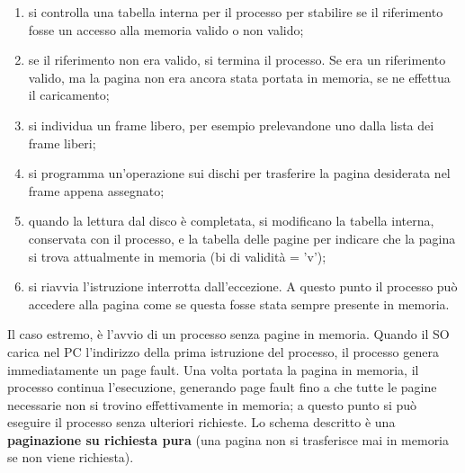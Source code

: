 \documentclass{article}
\begin{document}
				\begin{figure}[ht!]
				\end{figure}
				\begin{enumerate}
					\item si controlla una tabella interna per il processo per stabilire se il riferimento fosse un accesso alla memoria valido o non valido;
					\item se il riferimento non era valido, si termina il processo. Se era un riferimento valido, ma la pagina non era ancora stata portata in memoria, se ne effettua il caricamento;
					\item si individua un frame libero, per esempio prelevandone uno dalla lista dei frame liberi;
					\item si programma un’operazione sui dischi per trasferire la pagina desiderata nel frame appena assegnato;
					\item quando la lettura dal disco è completata, si modificano la tabella interna, conservata con il processo, e la tabella delle pagine per indicare che la pagina si trova attualmente in memoria (bi di validità = 'v');
					\item si riavvia l’istruzione interrotta dall’eccezione. A questo punto il processo può
					accedere alla pagina come se questa fosse stata sempre presente in memoria.
				\end{enumerate}
				Il caso estremo, è l'avvio di un processo senza pagine in memoria. Quando il SO carica nel PC l’indirizzo della prima istruzione del processo, il processo genera immediatamente un page fault. Una volta portata la pagina in memoria, il processo continua l’esecuzione, generando page fault fino a che tutte le pagine necessarie non si trovino effettivamente in memoria; a questo punto si può eseguire il processo senza ulteriori richieste. Lo schema descritto è una \textbf{paginazione su richiesta pura} (una pagina non si trasferisce mai in memoria se non viene richiesta).
\end{document}
